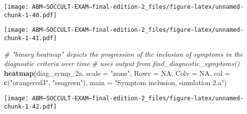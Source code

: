\documentclass[]{article}
\newenvironment{Shaded}{\begin{snugshade}}{\end{snugshade}}
\newcommand{\KeywordTok}[1]{\textcolor[rgb]{0.13,0.29,0.53}{\textbf{#1}}}
\newcommand{\DataTypeTok}[1]{\textcolor[rgb]{0.13,0.29,0.53}{#1}}
\newcommand{\DecValTok}[1]{\textcolor[rgb]{0.00,0.00,0.81}{#1}}
\newcommand{\StringTok}[1]{\textcolor[rgb]{0.31,0.60,0.02}{#1}}
\newcommand{\CommentTok}[1]{\textcolor[rgb]{0.56,0.35,0.01}{\textit{#1}}}
\newcommand{\OtherTok}[1]{\textcolor[rgb]{0.56,0.35,0.01}{#1}}
\newcommand{\OperatorTok}[1]{\textcolor[rgb]{0.81,0.36,0.00}{\textbf{#1}}}
\newcommand{\NormalTok}[1]{#1}
\begin{document}
\texttt{[image: ABM---SOCCULT-EXAM---final-edition-2\_files/figure-latex/unnamed-chunk-1-40.pdf]}

\begin{Shaded}
\end{Shaded}

\texttt{[image: ABM---SOCCULT-EXAM---final-edition-2\_files/figure-latex/unnamed-chunk-1-41.pdf]}

\begin{Shaded}
\begin{Highlighting}[]
\CommentTok{# "binary heatmap" depicts the progression of the inclusion of symptoms in the diagnostic criteria over time}
\CommentTok{# uses output from find_diagnostic_symptoms()}
\KeywordTok{heatmap}\NormalTok{(diag_symp_2a, }\DataTypeTok{scale =} \StringTok{"none"}\NormalTok{, }\DataTypeTok{Rowv =} \OtherTok{NA}\NormalTok{, }\DataTypeTok{Colv =} \OtherTok{NA}\NormalTok{, }\DataTypeTok{col =} \KeywordTok{c}\NormalTok{(}\StringTok{"orangered3"}\NormalTok{, }\StringTok{"seagreen"}\NormalTok{), }\DataTypeTok{main =} \StringTok{"Symptom inclusion, simulation 2.a"}\NormalTok{) }
\end{Highlighting}
\end{Shaded}

\texttt{[image: ABM---SOCCULT-EXAM---final-edition-2\_files/figure-latex/unnamed-chunk-1-42.pdf]}
\end{document}

